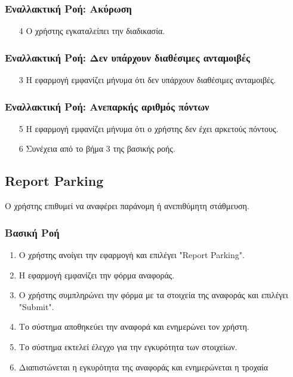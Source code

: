 \subsubsection{Εναλλακτική Ροή: Ακύρωση}

\begin{enumerate}
    \item[4] Ο χρήστης εγκαταλείπει την διαδικασία.
\end{enumerate}

\subsubsection{Εναλλακτική Ροή: Δεν υπάρχουν διαθέσιμες ανταμοιβές}

\begin{enumerate}
    \item[3] Η εφαρμογή εμφανίζει μήνυμα ότι δεν υπάρχουν διαθέσιμες ανταμοιβές.
\end{enumerate}

\subsubsection{Εναλλακτική Ροή: Ανεπαρκής αριθμός πόντων}

\begin{enumerate}
    \item[5] Η εφαρμογή εμφανίζει μήνυμα ότι ο χρήστης δεν έχει αρκετούς πόντους.
    \item[6] Συνέχεια από το βήμα 3 της βασικής ροής.
\end{enumerate}

\subsection{Report Parking}

Ο χρήστης επιθυμεί να αναφέρει παράνομη ή ανεπιθύμητη στάθμευση.

\subsubsection{Βασική Ροή}

\begin{enumerate}
    \item Ο χρήστης ανοίγει την εφαρμογή και επιλέγει "Report Parking".
    \item Η εφαρμογή εμφανίζει την φόρμα αναφοράς.
    \item Ο χρήστης συμπληρώνει την φόρμα με τα στοιχεία της αναφοράς
          και επιλέγει "Submit".
    \item Το σύστημα αποθηκεύει την αναφορά και ενημερώνει τον χρήστη.
    \item Το σύστημα εκτελεί έλεγχο για την εγκυρότητα των στοιχείων.
    \item Διαπιστώνεται η εγκυρότητα της αναφοράς και ενημερώνεται η τροχαία
\end{enumerate}

